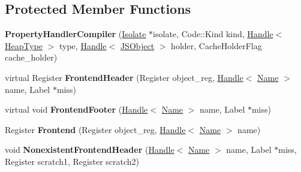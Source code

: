 \subsection*{Protected Member Functions}
\begin{DoxyCompactItemize}
\item 
\hypertarget{classv8_1_1internal_1_1_property_handler_compiler_a72333b5e452f946a98c8e3582420142e}{}{\bfseries Property\+Handler\+Compiler} (\hyperlink{classv8_1_1internal_1_1_isolate}{Isolate} $\ast$isolate, Code\+::\+Kind kind, \hyperlink{classv8_1_1internal_1_1_handle}{Handle}$<$ \hyperlink{classv8_1_1internal_1_1_type_impl}{Heap\+Type} $>$ type, \hyperlink{classv8_1_1internal_1_1_handle}{Handle}$<$ \hyperlink{classv8_1_1internal_1_1_j_s_object}{J\+S\+Object} $>$ holder, Cache\+Holder\+Flag cache\+\_\+holder)\label{classv8_1_1internal_1_1_property_handler_compiler_a72333b5e452f946a98c8e3582420142e}

\item 
\hypertarget{classv8_1_1internal_1_1_property_handler_compiler_ae65fd5c4b297d4e78fe66633e68b1b56}{}virtual Register {\bfseries Frontend\+Header} (Register object\+\_\+reg, \hyperlink{classv8_1_1internal_1_1_handle}{Handle}$<$ \hyperlink{classv8_1_1internal_1_1_name}{Name} $>$ name, Label $\ast$miss)\label{classv8_1_1internal_1_1_property_handler_compiler_ae65fd5c4b297d4e78fe66633e68b1b56}

\item 
\hypertarget{classv8_1_1internal_1_1_property_handler_compiler_a70769f25637e653ba559753e00919c1d}{}virtual void {\bfseries Frontend\+Footer} (\hyperlink{classv8_1_1internal_1_1_handle}{Handle}$<$ \hyperlink{classv8_1_1internal_1_1_name}{Name} $>$ name, Label $\ast$miss)\label{classv8_1_1internal_1_1_property_handler_compiler_a70769f25637e653ba559753e00919c1d}

\item 
\hypertarget{classv8_1_1internal_1_1_property_handler_compiler_adf4880d7b18f60fab678031e5d5db94c}{}Register {\bfseries Frontend} (Register object\+\_\+reg, \hyperlink{classv8_1_1internal_1_1_handle}{Handle}$<$ \hyperlink{classv8_1_1internal_1_1_name}{Name} $>$ name)\label{classv8_1_1internal_1_1_property_handler_compiler_adf4880d7b18f60fab678031e5d5db94c}

\item 
\hypertarget{classv8_1_1internal_1_1_property_handler_compiler_a1378868a0eb5fd209acd2d40871e5360}{}void {\bfseries Nonexistent\+Frontend\+Header} (\hyperlink{classv8_1_1internal_1_1_handle}{Handle}$<$ \hyperlink{classv8_1_1internal_1_1_name}{Name} $>$ name, Label $\ast$miss, Register scratch1, Register scratch2)\label{classv8_1_1internal_1_1_property_handler_compiler_a1378868a0eb5fd209acd2d40871e5360}


\end{DoxyCompactItemize}
